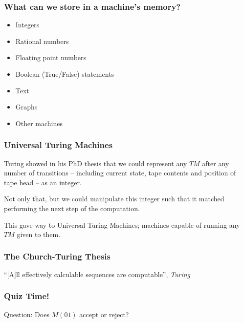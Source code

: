\documentclass[aspectratio=169]{beamer}
\begin{document}
\begin{frame}
\frametitle{What can we store in a machine's memory?}
\begin{itemize}
    \item<1-> Integers
    \item<2-> Rational numbers
    \item<3-> Floating point numbers
    \item<4-> Boolean (True/False) statements
    \item<5-> Text
    \item<6-> Graphs
    \item<7-> Other machines
\end{itemize}
\end{frame}

\begin{frame}
\frametitle{Universal Turing Machines}
Turing showed in his PhD thesis that we could represent any $TM$ after any number of transitions -- including current state, tape contents and position of tape head -- as an integer.

Not only that, but we could manipulate this integer such that it matched performing the next step of the computation.

This gave way to Universal Turing Machines; machines capable of running any $TM$ given to them.
\end{frame}

\begin{frame}
\frametitle{The Church-Turing Thesis}
\centerline{``[A]ll effectively calculable sequences are computable'', {\em Turing}}
\end{frame}

\begin{frame}
\frametitle{Quiz Time!}

\begin{center}
\end{center}

Question: Does $M(01)$ accept or reject?
\end{frame}
\end{document}
